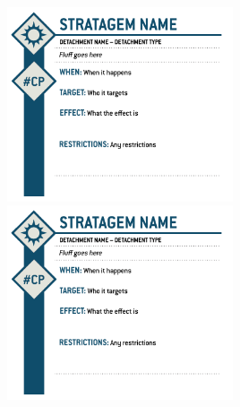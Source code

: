 \documentclass{report}
\begin{document}
\begin{minipage}[t][23.75cm][b]{\textwidth}
\includegraphics[width =0.5\textwidth]{Images/Stratagems/Stratagem_5.png}
\includegraphics[width =0.5\textwidth]{Images/Stratagems/Stratagem_6.png}
\end{minipage}
\end{document}
